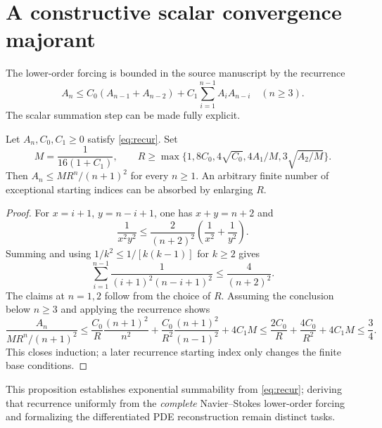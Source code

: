 \section{A constructive scalar convergence majorant}
The lower-order forcing is bounded in the source manuscript by the
recurrence
\begin{equation}\label{eq:recur}
 A_n\le C_0(A_{n-1}+A_{n-2})+
 C_1\sum_{i=1}^{n-1}A_iA_{n-i}\quad(n\ge3).
\end{equation}
The scalar summation step can be made fully explicit.
\begin{proposition}\label{prop:maj}
Let $A_n,C_0,C_1\ge0$ satisfy \eqref{eq:recur}. Set
\[
 M=\frac{1}{16(1+C_1)},\qquad
 R\ge\max\{1,8C_0,4\sqrt{C_0},
 4A_1/M,3\sqrt{A_2/M}\}.
\]
Then $A_n\le MR^n/(n+1)^2$ for every $n\ge1$.
An arbitrary finite number of exceptional starting indices
can be absorbed by enlarging $R$.
\end{proposition}
\begin{proof}
For $x=i+1$, $y=n-i+1$, one has $x+y=n+2$ and
\[
 \frac{1}{x^2y^2}\le\frac{2}{(n+2)^2}
 \left(\frac1{x^2}+\frac1{y^2}\right).
\]
Summing and using $1/k^2\le1/[k(k-1)]$ for $k\ge2$
gives
\[
 \sum_{i=1}^{n-1}\frac1{(i+1)^2(n-i+1)^2}
 \le\frac4{(n+2)^2}.
\]
The claims at $n=1,2$ follow from the choice of $R$.
Assuming the conclusion below $n\ge3$ and applying the
recurrence shows
\[
 \frac{A_n}{MR^n/(n+1)^2}\le
 \frac{C_0}{R}\frac{(n+1)^2}{n^2}
 +\frac{C_0}{R^2}\frac{(n+1)^2}{(n-1)^2}
 +4C_1M
 \le \frac{2C_0}{R}+\frac{4C_0}{R^2}+4C_1M
 \le\frac34.
\]
This closes induction; a later recurrence starting index only
changes the finite base conditions.
\end{proof}
This proposition establishes exponential summability from
\eqref{eq:recur}; deriving that recurrence uniformly from the
\emph{complete} Navier--Stokes lower-order forcing and formalizing
the differentiated PDE reconstruction remain distinct tasks.
